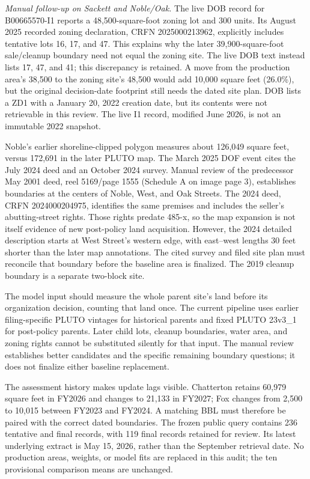 \textit{Manual follow-up on Sackett and Noble/Oak.} The live DOB record for
B00665570-I1 reports a 48,500-square-foot zoning lot and 300 units. Its
August 2025 recorded zoning declaration, CRFN 2025000213962, explicitly
includes tentative lots 16, 17, and 47. This explains why the later
39,900-square-foot sale/cleanup boundary need not equal the zoning site.
The live DOB text instead lists 17, 47, and 41; this discrepancy is retained.
A move from the production area's 38,500 to the zoning site's 48,500 would
add 10,000 square feet (26.0\%), but the original decision-date footprint
still needs the dated site plan. DOB lists a ZD1 with a January 20, 2022
creation date, but its contents were not retrievable in this review.
The live I1 record, modified June 2026, is not an immutable 2022 snapshot.

Noble's earlier shoreline-clipped polygon measures about 126,049 square feet,
versus 172,691 in the later PLUTO map. The March 2025 DOF event cites the
July 2024 deed and an October 2024 survey. Manual review of the predecessor
May 2001 deed, reel 5169/page 1555 (Schedule A on image page 3), establishes
boundaries at the centers of Noble, West, and Oak Streets. The 2024 deed,
CRFN 2024000204975, identifies the same premises and includes the seller's
abutting-street rights. Those rights predate 485-x, so the map expansion is
not itself evidence of new post-policy land acquisition. However, the 2024
detailed description starts at West Street's western edge, with east--west
lengths 30 feet shorter than the later map annotations. The cited survey
and filed site plan must reconcile that boundary before the baseline area
is finalized. The 2019 cleanup boundary is a separate two-block site.

The model input should measure the whole parent site's land before its
organization decision, counting that land once. The current pipeline uses
earlier filing-specific PLUTO vintages for historical parents and fixed
PLUTO 23v3\_1 for post-policy parents. Later child lots, cleanup boundaries,
water area, and zoning rights cannot be substituted silently for that input.
The manual review establishes better candidates and the specific remaining
boundary questions; it does not finalize either baseline replacement.

The assessment history makes update lags visible. Chatterton retains 60,979
square feet in FY2026 and changes to 21,133 in FY2027; Fox changes from 2,500
to 10,015 between FY2023 and FY2024. A matching BBL must therefore be paired
with the correct dated boundaries. The frozen public query contains 236
tentative and final records, with 119 final records retained for review. Its
latest underlying extract is May 15, 2026, rather than the September retrieval
date. No production areas, weights, or model fits are replaced in this audit;
the ten provisional comparison means are unchanged.

